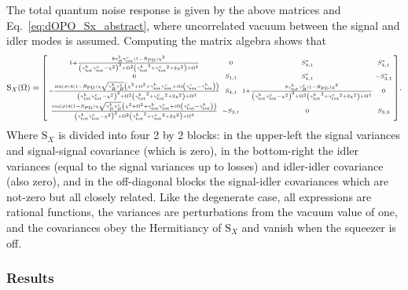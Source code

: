 The total quantum noise response is given by the above matrices and Eq.~\ref{eq:dOPO_Sx_abstract}, where uncorrelated vacuum between the signal and idler modes is assumed. Computing the matrix algebra shows that~\cite{} 
\begin{equation}\label{eq:nOPO_full_freedom}
\text{S}_X(\Omega)=\begin{bsmallmatrix}
1+\frac{8 \gamma^b_R {\gamma^c_\text{tot}} (1-R_\text{PD}) \chi ^2}{\left({\gamma^b_\text{tot}} {\gamma^c_\text{tot}}-\chi ^2\right)^2+\Omega ^2 \left({\gamma^b_\text{tot}}^2+{\gamma^c_\text{tot}}^2+2 \chi ^2\right)+\Omega ^4} & 0 & S_{3,1}^* & S_{4,1}^* \\
0 & S_{1,1} & S_{4,1}^* & -S_{3,1}^* \\
-\frac{\sin (\phi )4 (1-R_\text{PD}) \chi  \sqrt{\gamma^b_R \gamma^c_R}  \left(\chi ^2+\Omega^2+\gamma^b_\text{tot}\gamma^c_\text{tot}+i\Omega\left(\gamma^c_\text{tot}-\gamma^b_\text{tot}\right)\right)}{\left({\gamma^b_\text{tot}} {\gamma^c_\text{tot}}-\chi ^2\right)^2+\Omega ^2 \left({\gamma^b_\text{tot}}^2+{\gamma^c_\text{tot}}^2+2 \chi ^2\right)+\Omega ^4} & S_{4,1} & 1+\frac{8 {\gamma^b_\text{tot}} \gamma^c_R (1-R_\text{PD}) \chi ^2}{\left({\gamma^b_\text{tot}} {\gamma^c_\text{tot}}-\chi ^2\right)^2+\Omega ^2 \left({\gamma^b_\text{tot}}^2+{\gamma^c_\text{tot}}^2+2 \chi ^2\right)+\Omega ^4} & 0\\
\frac{\cos (\phi ) 4 (1-R_\text{PD}) \chi  \sqrt{\gamma^b_R \gamma^c_R} \left(\chi ^2+\Omega^2+\gamma^b_\text{tot}\gamma^c_\text{tot}+i\Omega\left(\gamma^c_\text{tot}-\gamma^b_\text{tot}\right)\right)}{\left({\gamma^b_\text{tot}} {\gamma^c_\text{tot}}-\chi ^2\right)^2+\Omega ^2 \left({\gamma^b_\text{tot}}^2+{\gamma^c_\text{tot}}^2+2 \chi ^2\right)+\Omega ^4} & -S_{3,1} & 0 & S_{3,3}
\end{bsmallmatrix}.\end{equation} 
Where $\text{S}_X$ is divided into four 2 by 2 blocks: in the upper-left the signal variances and signal-signal covariance (which is zero), in the bottom-right the idler variances (equal to the signal variances up to losses) and idler-idler covariance (also zero), and in the off-diagonal blocks the signal-idler covariances which are not-zero but all closely related. Like the degenerate case, all expressions are rational functions, the variances are perturbations from the vacuum value of one, and the covariances obey the Hermitiancy of $\text{S}_X$ and vanish when the squeezer is off. 

\subsubsection{Results} %
\label{sec:nOPO_results}

